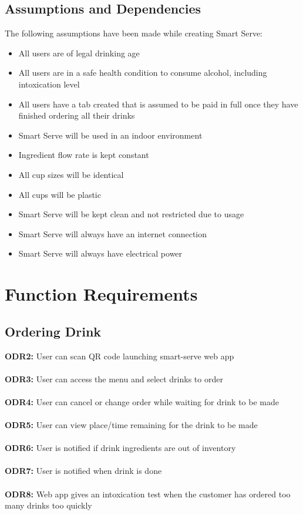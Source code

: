 \documentclass{article}
\begin{document}
\subsection{Assumptions and Dependencies} %
    The following assumptions have been made while creating Smart Serve:
    \begin{itemize}
        \item All users are of legal drinking age
        \item All users are in a safe health condition to consume alcohol, including intoxication level
        \item All users have a tab created that is assumed to be paid in full once they have finished ordering all their drinks
        \item Smart Serve will be used in an indoor environment
        \item Ingredient flow rate is kept constant
        \item All cup sizes will be identical
        \item All cups will be plastic
        \item Smart Serve will be kept clean and not restricted due to usage
        \item Smart Serve will always have an internet connection
        \item Smart Serve will always have electrical power
    \end{itemize}

\section{Function Requirements}
\subsection{Ordering Drink}
    \noindent\textbf{ODR2:} User can scan QR code launching smart-serve web app \\\\ 
    \textbf{ODR3:} User can access the menu and select drinks to order\\\\ 
    \textbf{ODR4:} User can cancel or change order while waiting for drink to be made \\\\ 
    \textbf{ODR5:} User can view place/time remaining for the drink to be made \\\\ 
    \textbf{ODR6:} User is notified if drink ingredients are out of inventory\\\\ 
    \textbf{ODR7:} User is notified when drink is done\\\\
    \textbf{ODR8:} Web app gives an intoxication test when the customer has ordered too many drinks too quickly\\
\end{document}
